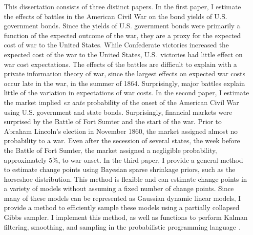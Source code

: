 
This dissertation consists of three distinct papers.
In the first paper, I estimate the effects of battles in the American Civil War on the bond yields of U.S. government bonds.
Since the yields of U.S. government bonds were primarily a function of the expected outcome of the war, they are a proxy for the expected cost of war to the United States.
While Confederate victories increased the expected cost of the war to the United States, U.S.\ victories had little effect on war cost expectations.
The effects of the battles are difficult to explain with a private information theory of war, since the largest effects on expected war costs occur late in the war, in the summer of 1864.
Surprisingly, major battles explain little of the variation in expectations of war costs.
In the second paper, I estimate the market implied \textit{ex ante} probability of the onset of the American Civil War using U.S. government and state bonds.
Surprisingly, financial markets were surprised by the Battle of Fort Sumter and the start of the war.
Prior to Abraham Lincoln's election in November 1860, the market assigned almost no probability to a war.
Even after the secession of several states, the week before the Battle of Fort Sumter, the market assigned a negligible probability, approximately 5\%, to war onset.
In the third paper, I provide a general method to estimate change points using Bayesian sparse shrinkage priors, such as the horseshoe distribution.
This method is flexible and can estimate change points in a variety of models without assuming a fixed number of change points.
Since many of these models can be represented as Gaussian dynamic linear models, I provide a method to efficiently sample these models using a partially collapsed Gibbs sampler. I implement this method, as well as functions to perform Kalman filtering, smoothing, and sampling in the probabilistic programming language \Stan{}.




